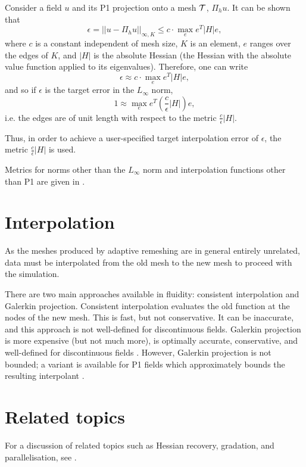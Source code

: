Consider a field $u$ and its P1 projection onto a mesh $\cal{T}$,
$\Pi_h u$. It can be shown \citep{frey2005} that
\begin{equation}
\epsilon = ||u - \Pi_h u||_{{\infty},K} \le c \cdot \max_e e^T \left| H \right| e,
\end{equation}
where $c$ is a constant independent of mesh size, $K$ is an element, $e$ ranges
over the edges of $K$, and $\left| H \right|$ is the absolute Hessian (the Hessian
with the absolute value function applied to its eigenvalues). 
Therefore, one can write
\begin{equation}
\epsilon \approx c \cdot \max_e e^T \left| H \right| e,
\end{equation}
and so if $\epsilon$ is the target error in the $L_{\infty}$ norm,
\begin{equation}
1 \approx \max_e e^T \left( \frac{c}{\epsilon} \left| H \right| \right) e,
\end{equation}
i.e. the edges are of unit length with respect to the metric
$\frac{c}{\epsilon} \left| H \right|$.

Thus, in order to achieve a user-specified target interpolation error of $\epsilon$, 
the metric $\frac{c}{\epsilon} \left| H \right|$ is used.

Metrics for norms other than the $L_{\infty}$ norm and interpolation functions
other than P1 are given in \citet{huang2005}. 

\section{Interpolation} \label{sec:interpolation}
As the meshes produced by adaptive remeshing are in general entirely
unrelated, data must be interpolated from the old mesh to the new mesh
to proceed with the simulation.

There are two main approaches available in fluidity: consistent interpolation
and Galerkin projection. Consistent interpolation evaluates the old function
at the nodes of the new mesh. This is fast, but not conservative. It can be inaccurate,
and this approach is not well-defined for discontinuous fields.
Galerkin projection is more expensive (but not much more), is optimally accurate,
conservative, and well-defined for discontinuous fields \citep{farrell2009i}.
However, Galerkin projection is not bounded; a variant is available for P1 fields
which approximately bounds the resulting interpolant \citep{farrell2009a}.

\section{Related topics} \label{sec:adaptivity_related_topics}
For a discussion of related topics such as Hessian recovery, gradation, and parallelisation,
see \citep{farrell2009i}.
